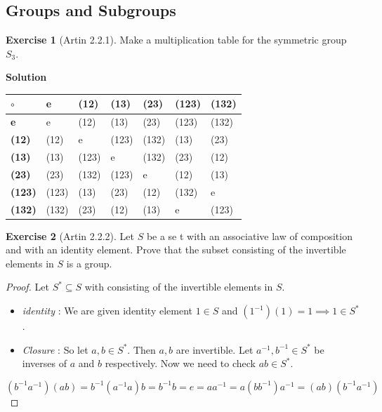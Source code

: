 \documentclass[
]{book}
\theoremstyle{definition}
\theoremstyle{definition}
\theoremstyle{definition}
\newtheorem{exercise}{Exercise}[chapter]
\theoremstyle{definition}
\theoremstyle{remark}
\begin{document}
\hypertarget{groups-and-subgroups-1}{%
\subsection{Groups and Subgroups}\label{groups-and-subgroups-1}}

\begin{exercise}[Artin 2.2.1]
\protect\hypertarget{exr:unnamed-chunk-83}{}\label{exr:unnamed-chunk-83}Make a multiplication table for the symmetric group \(S_3\).
\end{exercise}

\textbf{Solution}

\begin{longtable}[]{@{}lllllll@{}}
\toprule\noalign{}
\(\circ\) & \textbf{e} & (12) & (13) & (23) & (123) & (132) \\
\midrule\noalign{}
\endhead
\bottomrule\noalign{}
\endlastfoot
\textbf{e} & e & (12) & (13) & (23) & (123) & (132) \\
\textbf{(12)} & (12) & e & (123) & (132) & (13) & (23) \\
\textbf{(13)} & (13) & (123) & e & (132) & (23) & (12) \\
\textbf{(23)} & (23) & (132) & (123) & e & (12) & (13) \\
\textbf{(123)} & (123) & (13) & (23) & (12) & (132) & e \\
\textbf{(132)} & (132) & (23) & (12) & (13) & e & (123) \\
\end{longtable}

\begin{exercise}[Artin 2.2.2]
\protect\hypertarget{exr:unnamed-chunk-84}{}\label{exr:unnamed-chunk-84}Let \(S\) be a se t with an associative law of composition and with an identity element. Prove that the subset consisting of the invertible elements in \(S\) is a group.
\end{exercise}

\begin{proof}
Let \(S^*\subseteq S\) with consisting of the invertible elements in \(S\).

\begin{itemize}
\item
  \emph{identity} : We are given identity element \(1 \in S\) and \((1^{-1})(1)=1 \implies 1 \in S^*\).
\item
  \emph{Closure} :
  So let \(a,b\in S^*\). Then \(a,b\) are invertible. Let \(a^{-1},b^{-1}\in S^*\) be inverses of \(a\) and \(b\) respectively. Now we need to check \(ab\in S^*\).\\
\end{itemize}

\[(b^{-1}a^{-1})(ab)=b^{-1}(a^{-1}a)b=b^{-1}b=e=
  aa^{-1}=a(bb^{-1})a^{-1}=(ab)(b^{-1}a^{-1})\]
\end{proof}
\end{document}
